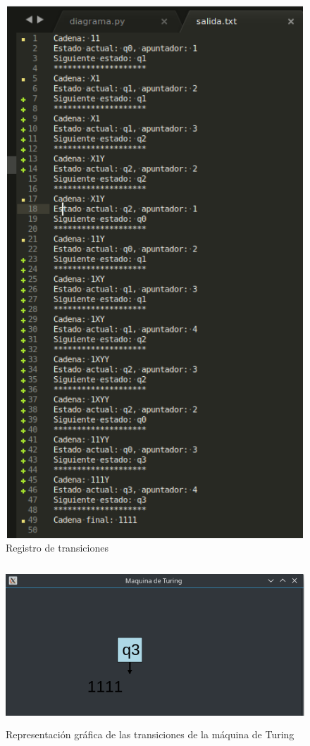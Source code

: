 \begin{figure}[H]
\begin{center}
 \includegraphics[width=13cm, height=20cm]{./img/dos_historial.png}
 \caption{Registro de transiciones}
 \label{fig:dos_historial}
\end{center}
\end{figure}

\begin{figure}[H]
\begin{center}
 \includegraphics[width=13cm, height=6cm]{./img/dos_grafica.png}
 \caption{Representación gráfica de las transiciones de la máquina de Turing}
 \label{fig:dos_grafica}
\end{center}
\end{figure}

